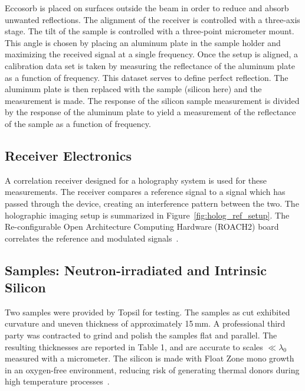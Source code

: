 Eccosorb is placed on surfaces outside the beam in order to reduce and absorb unwanted reflections.   The alignment of the receiver is controlled with a three-axis stage. The tilt of the sample is controlled with a three-point micrometer mount.   This angle is chosen by placing an aluminum plate in the sample holder and maximizing the received signal at a single frequency. Once the setup is aligned, a calibration data set is taken by measuring the reflectance of the aluminum plate as a function of frequency. This dataset serves to define perfect reflection.   The aluminum plate is then replaced with the sample (silicon here) and the measurement is made. The response of the silicon sample measurement is divided by the response of the aluminum plate to yield a measurement of the reflectance of the sample as a function of frequency.

\subsection{Receiver Electronics}
A correlation receiver designed for a holography system is used for these measurements. The receiver compares a reference signal to a signal which has passed through the device, creating an interference pattern between the two.   The holographic imaging setup is summarized in Figure~\ref{fig:holog_ref_setup}.   The Re-configurable Open Architecture Computing Hardware (ROACH2) board correlates the reference and modulated signals~\cite{roach2}.

\subsection{Samples: Neutron-irradiated and Intrinsic Silicon}
Two samples were provided by Topsil for testing. The samples as cut exhibited curvature and uneven thickness of approximately 15\,mm. A professional third party was contracted to grind and polish the samples flat and parallel. The
resulting thicknesses are reported in Table 1, and are accurate to scales $\ll \lambda_0$ measured with a micrometer. The silicon is made with Float Zone mono growth in an oxygen-free environment, reducing risk of generating thermal donors during
high temperature processes~\cite{topsil}.
